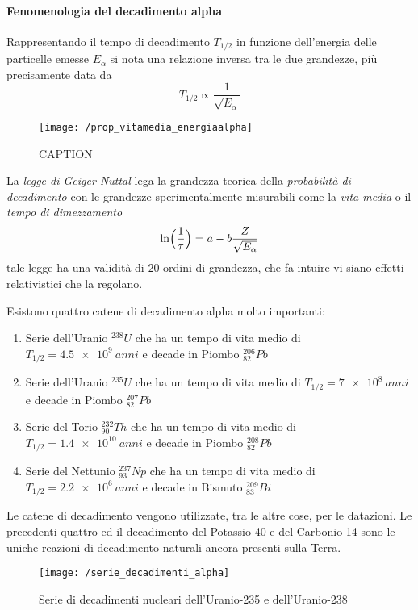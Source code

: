 \paragraph{Fenomenologia del decadimento alpha} Rappresentando il tempo di decadimento $T_{1/2}$ in funzione dell'energia delle particelle emesse $E_{\alpha}$ si nota una relazione inversa tra le due grandezze, più precisamente data da
\begin{equation}
T_{1/2} \propto \frac{1}{\sqrt{E_{\alpha}}}
\end{equation}
\begin{figure}[h]
\centering
\texttt{[image: /prop\_vitamedia\_energiaalpha]}
\caption{CAPTION}
\end{figure}
La \emph{legge di Geiger Nuttal} lega la grandezza teorica della \emph{probabilità di decadimento} con le grandezze sperimentalmente misurabili come la \emph{vita media} o il \emph{tempo di dimezzamento}
\begin{equation}
\ln \Bigl(  \frac{1}{\tau}  \Bigr) = a - b \frac{Z}{\sqrt{E_{\alpha}}}
\end{equation}
tale legge ha una validità di $20$ ordini di grandezza, che fa intuire vi siano effetti relativistici che la regolano.

Esistono quattro catene di decadimento alpha molto importanti:
\begin{enumerate}
\item Serie dell'Uranio $^{238}U$ che ha un tempo di vita medio di  $T_{1/2}=\SI{4.5e9}{anni}$ e decade in Piombo $^{206}_{82}Pb$

\item Serie dell'Uranio $^{235}U$ che ha un tempo di vita medio di  $T_{1/2}=\SI{7e8}{anni}$ e decade in Piombo $^{207}_{82}Pb$

\item Serie del Torio $^{232}_{90}Th$ che ha un tempo di vita medio di  $T_{1/2}=\SI{1.4e10}{anni}$ e decade in Piombo $^{208}_{82}Pb$

\item Serie del Nettunio $^{237}_{93}Np$ che ha un tempo di vita medio di  $T_{1/2}=\SI{2.2e6}{anni}$ e decade in Bismuto $^{209}_{83}Bi$
\end{enumerate}
Le catene di decadimento vengono utilizzate, tra le altre cose, per le datazioni.
Le precedenti quattro ed il decadimento del Potassio-40 e del Carbonio-14 sono le uniche reazioni di decadimento naturali ancora presenti sulla Terra.
\begin{figure}[h]
\centering
\texttt{[image: /serie\_decadimenti\_alpha]}
\caption{Serie di decadimenti nucleari dell'Uranio-235 e dell'Uranio-238}
\end{figure}















